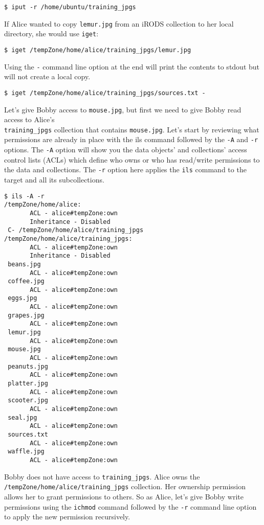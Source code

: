 \documentclass[10pt,oneside]{memoir}
\begin{document}
\begin{lstlisting}
$ iput -r /home/ubuntu/training_jpgs
\end{lstlisting}

If Alice wanted to copy \texttt{lemur.jpg} from an iRODS collection to her local directory, she would use \texttt{iget}:

\begin{lstlisting}
$ iget /tempZone/home/alice/training_jpgs/lemur.jpg
\end{lstlisting}

Using the \texttt{-} command line option at the end will print the contents to stdout but will not create a local copy.

\begin{lstlisting}
$ iget /tempZone/home/alice/training_jpgs/sources.txt -
\end{lstlisting}

Let's give Bobby access to \texttt{mouse.jpg}, but first we need to give Bobby read access to Alice's \\
\texttt{training\_jpgs} collection that contains \texttt{mouse.jpg}. Let's start by reviewing what permissions are already in place with the ils command followed by the \texttt{-A} and \texttt{-r} options. The \texttt{-A} option will show you the data objects' and collections' access control lists (ACLs) which define who owns or who has read/write permissions to the data and collections. The \texttt{-r} option here applies the \texttt{ils} command to the target and all its subcollections.

\begin{lstlisting}
$ ils -A -r
/tempZone/home/alice:
       ACL - alice#tempZone:own
       Inheritance - Disabled
 C- /tempZone/home/alice/training_jpgs
/tempZone/home/alice/training_jpgs:
       ACL - alice#tempZone:own
       Inheritance - Disabled
 beans.jpg
       ACL - alice#tempZone:own
 coffee.jpg
       ACL - alice#tempZone:own
 eggs.jpg
       ACL - alice#tempZone:own
 grapes.jpg
       ACL - alice#tempZone:own
 lemur.jpg
       ACL - alice#tempZone:own
 mouse.jpg
       ACL - alice#tempZone:own
 peanuts.jpg
       ACL - alice#tempZone:own
 platter.jpg
       ACL - alice#tempZone:own
 scooter.jpg
       ACL - alice#tempZone:own
 seal.jpg
       ACL - alice#tempZone:own
 sources.txt
       ACL - alice#tempZone:own
 waffle.jpg
       ACL - alice#tempZone:own
\end{lstlisting}

Bobby does not have access to \texttt{training\_jpgs}. Alice owns the \texttt{/tempZone/home/alice/training\_jpgs} collection. Her ownership permission allows her to grant permissions to others. So as Alice, let's give Bobby write permissions using the \texttt{ichmod} command followed by the \texttt{-r} command line option to apply the new permission recursively.
\end{document}
